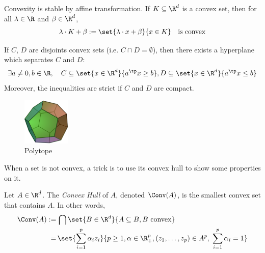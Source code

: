 \documentclass{../cs-classes/cs-classes}
\begin{document}
\begin{property}
    Convexity is stable by affine transformation. If $K\subseteq\R^d$ is a convex set, then for all $\lambda\in\R$ and $\beta\in \R^d$,
    \begin{equation*}
        \lambda\cdot K+\beta := \set{\lambda\cdot x+\beta}{x\in K} \quad \textnormal{is convex}
    \end{equation*}
\end{property}

\begin{property}
    If $C$, $D$ are disjoints convex sets (i.e. $C\cap D=\emptyset$), then there exists a hyperplane which separates $C$ and $D$:
    \begin{equation*}
        \exists a\neq0, b\in\R, \quad C\subseteq\set{x\in\R^d}{a^\tp x\geq b}, D\subseteq\set{x\in\R^d}{a^\tp x\leq b}
    \end{equation*}
    Moreover, the inequalities are strict if $C$ and $D$ are compact.
\end{property}

\begin{figure}
    \centering
        \captionsetup{justification=centering}
        \includegraphics[width=0.2\textwidth]{images/polytope.png}
        \caption{Polytope}
\end{figure}
When a set is not convex, a trick is to use its convex hull to show some properties on it.
\begin{definition}
    Let $A\in\R^d$. The \emph{Convex Hull} of $A$, denoted $\Conv(A)$, is the smallest convex set that contains $A$. In other words,
    \begin{equation*}
        \begin{aligned}
            \Conv(A):=&\,\bigcap\set{B\in\R^d}{A\subseteq B, B \textnormal{ convex}}\\
            =&\,\set{\sum_{i=1}^p\alpha_iz_i}{p\geq 1, \alpha\in\R_+^p, (z_1, \dots, z_p)\in A^p, \; \sum_{i=1}^p \alpha_i=1}
        \end{aligned}
    \end{equation*}
\end{definition}
\end{document}
